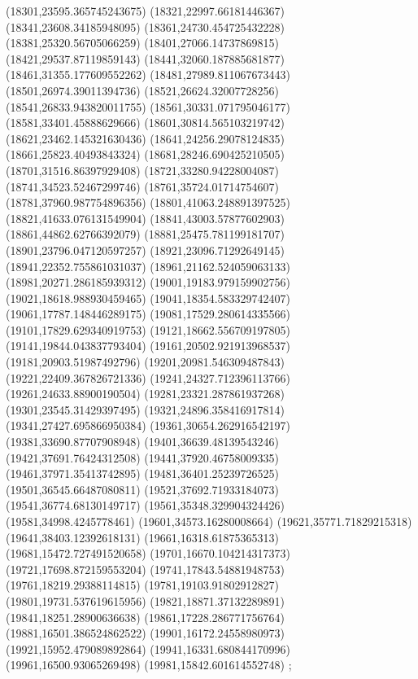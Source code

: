 {(18301,23595.365745243675)
(18321,22997.66181446367)
(18341,23608.34185948095)
(18361,24730.454725432228)
(18381,25320.56705066259)
(18401,27066.14737869815)
(18421,29537.87119859143)
(18441,32060.187885681877)
(18461,31355.177609552262)
(18481,27989.811067673443)
(18501,26974.39011394736)
(18521,26624.32007728256)
(18541,26833.943820011755)
(18561,30331.071795046177)
(18581,33401.45888629666)
(18601,30814.565103219742)
(18621,23462.145321630436)
(18641,24256.29078124835)
(18661,25823.40493843324)
(18681,28246.690425210505)
(18701,31516.86397929408)
(18721,33280.94228004087)
(18741,34523.52467299746)
(18761,35724.01714754607)
(18781,37960.987754896356)
(18801,41063.248891397525)
(18821,41633.076131549904)
(18841,43003.57877602903)
(18861,44862.62766392079)
(18881,25475.781199181707)
(18901,23796.047120597257)
(18921,23096.71292649145)
(18941,22352.755861031037)
(18961,21162.524059063133)
(18981,20271.286185939312)
(19001,19183.979159902756)
(19021,18618.988930459465)
(19041,18354.583329742407)
(19061,17787.148446289175)
(19081,17529.280614335566)
(19101,17829.629340919753)
(19121,18662.556709197805)
(19141,19844.043837793404)
(19161,20502.921913968537)
(19181,20903.51987492796)
(19201,20981.546309487843)
(19221,22409.367826721336)
(19241,24327.712396113766)
(19261,24633.88900190504)
(19281,23321.287861937268)
(19301,23545.31429397495)
(19321,24896.358416917814)
(19341,27427.695866950384)
(19361,30654.262916542197)
(19381,33690.87707908948)
(19401,36639.48139543246)
(19421,37691.76424312508)
(19441,37920.46758009335)
(19461,37971.35413742895)
(19481,36401.25239726525)
(19501,36545.66487080811)
(19521,37692.71933184073)
(19541,36774.68130149717)
(19561,35348.329904324426)
(19581,34998.4245778461)
(19601,34573.16280008664)
(19621,35771.71829215318)
(19641,38403.12392618131)
(19661,16318.61875365313)
(19681,15472.727491520658)
(19701,16670.104214317373)
(19721,17698.872159553204)
(19741,17843.54881948753)
(19761,18219.29388114815)
(19781,19103.91802912827)
(19801,19731.537619615956)
(19821,18871.37132289891)
(19841,18251.28900636638)
(19861,17228.286771756764)
(19881,16501.386524862522)
(19901,16172.24558980973)
(19921,15952.479089892864)
(19941,16331.680844170996)
(19961,16500.93065269498)
(19981,15842.601614552748)
};
